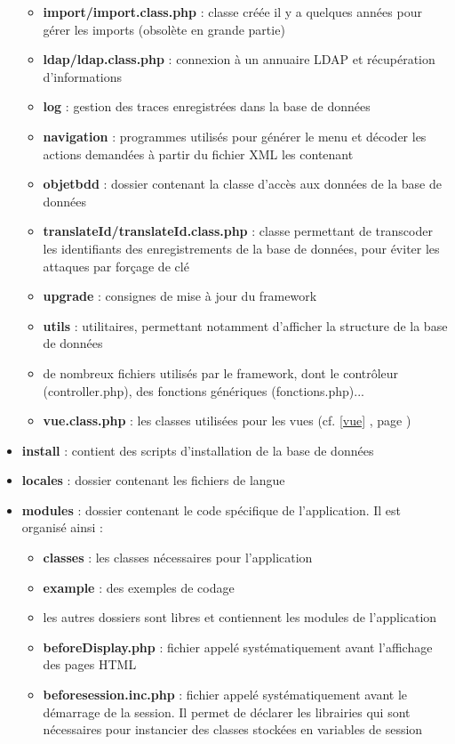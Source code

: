 \begin{itemize}
\begin{itemize}
\item \textbf{import/import.class.php} : classe créée il y a quelques années pour gérer les imports (obsolète en grande partie)
\item \textbf{ldap/ldap.class.php} : connexion à un annuaire LDAP et récupération d'informations
\item \textbf{log} : gestion des traces enregistrées dans la base de données
\item \textbf{navigation} : programmes utilisés pour générer le menu et décoder les actions demandées à partir du fichier XML les contenant
\item \textbf{objetbdd} : dossier contenant la classe d'accès aux données de la base de données
\item \textbf{translateId/translateId.class.php} : classe permettant de transcoder les identifiants des enregistrements de la base de données, pour éviter les attaques par forçage de clé
\item \textbf{upgrade} : consignes de mise à jour du framework
\item \textbf{utils} : utilitaires, permettant notamment d'afficher la structure de la base de données
\item de nombreux fichiers utilisés par le framework, dont le contrôleur (controller.php), des fonctions génériques (fonctions.php)...
\item \textbf{vue.class.php} : les classes utilisées pour les vues (cf. \ref{vue} \textit{}, page \pageref{vue})
\end{itemize}
\item \textbf{install} : contient des scripts d'installation de la base de données
\item \textbf{locales} : dossier contenant les fichiers de langue
\item \textbf{modules} : dossier contenant le code spécifique de l'application. Il est organisé ainsi :
\begin{itemize}
\item \textbf{classes} : les classes nécessaires pour l'application
\item \textbf{example} : des exemples de codage
\item les autres dossiers sont libres et contiennent les modules de l'application
\item \textbf{beforeDisplay.php} : fichier appelé systématiquement avant l'affichage des pages HTML
\item \textbf{beforesession.inc.php} : fichier appelé systématiquement avant le démarrage de la session. Il permet de déclarer les librairies qui sont nécessaires pour instancier des classes stockées en variables de session

\end{itemize}
\end{itemize}
